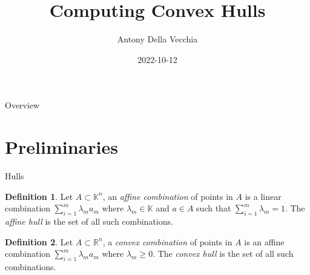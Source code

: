 \documentclass[9pt]{beamer}
\author{Antony Della Vecchia}
\title{Computing Convex Hulls}
\institute[]{
Technische Universit\"at Berlin
}
\date{
2022-10-12
}
\theoremstyle{definition}
\newtheorem{defn}{Definition}
\begin{document}
\maketitle
\begin{frame}[fragile]{Overview}
  \begin{tcolorbox}
    \tableofcontents
  \end{tcolorbox}
\end{frame}

\section{Preliminaries}

\begin{frame}[fragile]{Hulls}
  \begin{defn}
    Let $A \subset \mathbb{K}^n$, an \emph{affine combination} of points in $A$
    is a linear combination $\sum_{i=1}^m \lambda_m a_m$ where $\lambda_m \in
    \mathbb{K}$ and $a \in A$ such that $\sum_{i=1}^m \lambda_m = 1$. The
    \emph{affine hull} is the set of all such combinations.
  \end{defn}

    \begin{defn}
    Let $A \subset \mathbb{R}^n$, a \emph{convex combination} of points in $A$
    is an affine combination $\sum_{i=1}^m \lambda_m a_m$ where $\lambda_m \geq
    0$. The  \emph{convex hull} is the set of all such combinations.
  \end{defn}

\end{frame}
\end{document}
